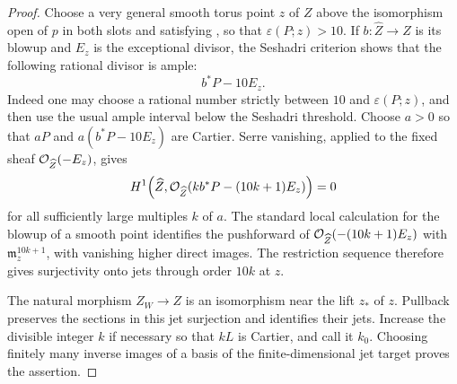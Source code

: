 \begin{proof}
Choose a very general smooth torus point \(z\) of \(Z\) above the
isomorphism open of \(p\) in both slots and satisfying
, so that \(\varepsilon(P;z)>10\). If
\(b:\widehat Z\to Z\) is its blowup and \(E_z\) is the exceptional
divisor, the Seshadri criterion shows that the following rational divisor
is ample:
\[
 b^*P-10E_z.
\]
Indeed one may choose a rational
number strictly between \(10\) and \(\varepsilon(P;z)\), and then
use the usual ample interval below the Seshadri threshold.
Choose \(a>0\) so that \(aP\) and
\(a(b^*P-10E_z)\) are Cartier. Serre vanishing, applied to the
fixed sheaf \(\mathcal O_{\widehat Z}(-E_z)\), gives
\[
 H^1\!\left(\widehat Z,
  \mathcal O_{\widehat Z}(kb^*P-(10k+1)E_z)\right)=0
\]
for all sufficiently large multiples \(k\) of \(a\).
The standard local calculation for the blowup of a smooth point
identifies the pushforward of
\(\mathcal O_{\widehat Z}(-(10k+1)E_z)\) with
\(\mathfrak m_z^{10k+1}\), with vanishing higher direct images.
The restriction sequence therefore gives surjectivity onto jets
through order \(10k\) at \(z\).

The natural morphism \(Z_W\to Z\) is an isomorphism near the lift
\(z_*\) of \(z\). Pullback preserves the sections in this jet
surjection and identifies their jets. Increase the divisible
integer \(k\) if necessary so that \(kL\) is Cartier, and call it
\(k_0\). Choosing finitely many inverse images of a basis of the
finite-dimensional jet target proves the assertion.
\end{proof}
